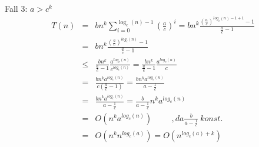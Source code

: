   Fall 3: $a > c^{k}$
  \begin{eqnarray}
  T(n) &=& bn^{k} \sum\limits_{i=0}^{\log_{c}(n) - 1}{({\frac{a}{c}})}^{i} = bn^{k} \frac{{(\frac{a}{c})}^{log_{c}(n)- 1 +1} - 1}{\frac{a}{c} - 1}\\
  &=& bn^{k} \frac{{(\frac{a}{c})}^{log_{c}(n)} - 1}{\frac{a}{c} - 1}\\
  &\leq& \frac{bn^{k}}{\frac{a}{c}-1} \frac{a^{log_{c}(n)}}{c^{log_{c}(n)}} = \frac{bn^{k}}{\frac{a}{c}-1} \frac{a^{log_{c}(n)}}{c}\\
  &=& \frac{bn^{k} a^{log_{c}(n)}}{c(\frac{a}{c} - 1)} = \frac{bn^{k} a^{log_{c}(n)}}{a- \frac{1}{c}}\\
  &=& \frac{bn^{k} a^{log_{c}(n)}}{a - \frac{1}{c}} = \frac{b}{a - \frac{1}{c}} n^{k}a^{log_{c}(n)}\\
  &=& O(n^{k}a^{log_{c}(n)}) \hspace{1cm}, da \frac{b}{a - \frac{1}{c}} \ konst.\\
  &=& O(n^{k}n^{log_{c}(a)}) = O(n^{log_{c}(a)+ k} )\\ 
  \end{eqnarray}


